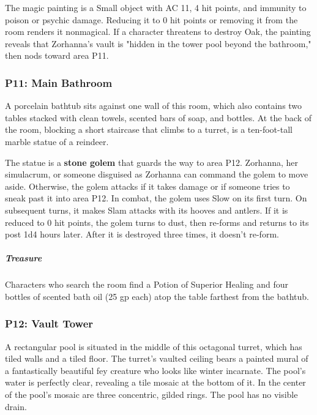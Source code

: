 \documentclass[10pt,a4paper,twoside,bg=print,twocolumn,openany,nodeprecatedcode]{dndbook}
\begin{document}
The magic painting is a Small object with AC 11, 4 hit points, and immunity to poison or psychic damage. Reducing it to 0 hit points or removing it from the room renders it nonmagical. If a character threatens to destroy Oak, the painting reveals that Zorhanna's vault is "hidden in the tower pool beyond the bathroom," then nods toward area P11.

\subsubsection{P11: Main Bathroom}
\begin{DndReadAloud}{}
A porcelain bathtub sits against one wall of this room, which also contains two tables stacked with clean towels, scented bars of soap, and bottles. At the back of the room, blocking a short staircase that climbs to a turret, is a ten-foot-tall marble statue of a reindeer.

\end{DndReadAloud}

The statue is a \textbf{stone golem} that guards the way to area P12. Zorhanna, her simulacrum, or someone disguised as Zorhanna can command the golem to move aside. Otherwise, the golem attacks if it takes damage or if someone tries to sneak past it into area P12. In combat, the golem uses Slow on its first turn. On subsequent turns, it makes Slam attacks with its hooves and antlers. If it is reduced to 0 hit points, the golem turns to dust, then re-forms and returns to its post 1d4 hours later. After it is destroyed three times, it doesn't re-form.

\subparagraph{Treasure}
Characters who search the room find a Potion of Superior Healing and four bottles of scented bath oil (25 gp each) atop the table farthest from the bathtub.

\subsubsection{P12: Vault Tower}
\begin{DndReadAloud}{}
A rectangular pool is situated in the middle of this octagonal turret, which has tiled walls and a tiled floor. The turret's vaulted ceiling bears a painted mural of a fantastically beautiful fey creature who looks like winter incarnate. The pool's water is perfectly clear, revealing a tile mosaic at the bottom of it. In the center of the pool's mosaic are three concentric, gilded rings. The pool has no visible drain.

\end{DndReadAloud}
\end{document}

